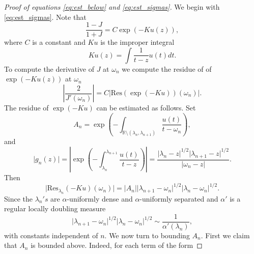 \documentclass{article}[12pt]
\theoremstyle{remark}
\begin{document}
            \begin{proof}[Proof of equations \eqref{eq:est_below} and \eqref{eq:est_sigmas}]
            We begin with \eqref{eq:est_sigmas}. Note that
            \begin{equation*}
                \frac{1-J}{1+J} = C\exp\left( -Ku(z) \right),
            \end{equation*}
            where $C$ is a constant and $Ku$ is the improper integral
            \begin{equation*}
                Ku(z) = \int\frac{1}{t-z}u(t)dt.
            \end{equation*}
            To compute the derivative of $J$ at $\omega_{n}$ we compute the residue of of $\exp(-Ku(z))$ at $\omega_{n}$
            \begin{equation*}
                 \left\lvert \frac{2}{J'(\omega_{n})} \right\rvert = C\lvert\text{Res}(\exp(-Ku))(\omega_{n})\rvert.
            \end{equation*}          
            The residue of $\exp(-Ku)$ can be estimated as follows. Set
            \begin{equation*}
                A_{n} = \exp\left( -\int_{\mathbb{R}\setminus (\lambda_{n},\lambda_{n+1})} \frac{u(t)}{t-\omega_{n}}\right),
            \end{equation*}
            and
            \begin{equation*}
                \lvert g_{n}(z)\rvert = \left\lvert \exp\left( -\int_{\lambda_{n}}^{\lambda_{n+1}} \frac{u(t)}{t-z}\right)\right\rvert = \frac{\lvert\lambda_{n}-z\rvert^{1/2} \lvert\lambda_{n+1}-z\rvert^{1/2}}{\lvert\omega_{n}-z\rvert}.
            \end{equation*}
            Then
            \begin{equation*}
                \lvert \text{Res}_{\lambda_{n}}(-Ku)(\omega_{n}) \rvert = \lvert A_{n} \rvert \lvert\lambda_{n+1}-\omega_{n}\rvert^{1/2}\lvert \lambda_{n}-\omega_{n}\rvert^{1/2}.
            \end{equation*}
            Since the $\lambda_{n}'s$ are $\alpha$-uniformly dense and $\alpha$-uniformly separated and $\alpha'$ is a regular locally doubling measure
            \begin{equation*}
                \lvert\lambda_{n+1}-\omega_{n}\rvert^{1/2}\lvert \lambda_{n}-\omega_{n}\rvert^{1/2} \sim \frac{1}{\alpha'(\lambda_{n})},
            \end{equation*}
            with constants independent of $n$. We now turn to bounding $A_{n}$. First we claim that $A_{n}$ is bounded above. Indeed, for each term of the form

\end{proof}
\end{document}
